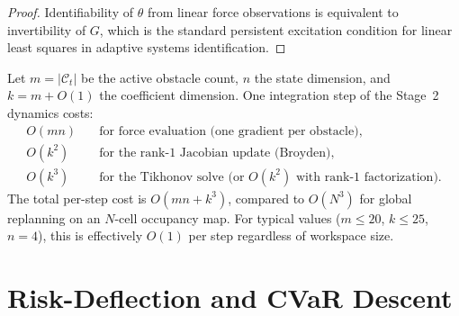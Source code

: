 \begin{proof}
Identifiability of $\theta$ from linear force observations is
equivalent to invertibility of $G$, which is the standard persistent
excitation condition for linear least squares in adaptive systems
identification.
\end{proof}

\begin{proposition}
\label{app:prop:complexity}
Let $m = |\mathcal{C}_t|$ be the active obstacle count, $n$ the
state dimension, and $k = m + O(1)$ the coefficient dimension.
One integration step of the Stage~2 dynamics costs:
\begin{align*}
  O(mn) &\quad\text{for force evaluation (one gradient per obstacle)},\\
  O(k^2) &\quad\text{for the rank-1 Jacobian update (Broyden)},\\
  O(k^3) &\quad\text{for the Tikhonov solve (or }O(k^2)\text{ with
           rank-1 factorization)}.
\end{align*}
The total per-step cost is $O(mn + k^3)$, compared to $O(N^3)$ for
global replanning on an $N$-cell occupancy map.
For typical values ($m\leq 20$, $k\leq 25$, $n=4$), this is
effectively $O(1)$ per step regardless of workspace size.
\end{proposition}

\section{Risk-Deflection and CVaR Descent}
\label{app:risk_deflect_cvar}

